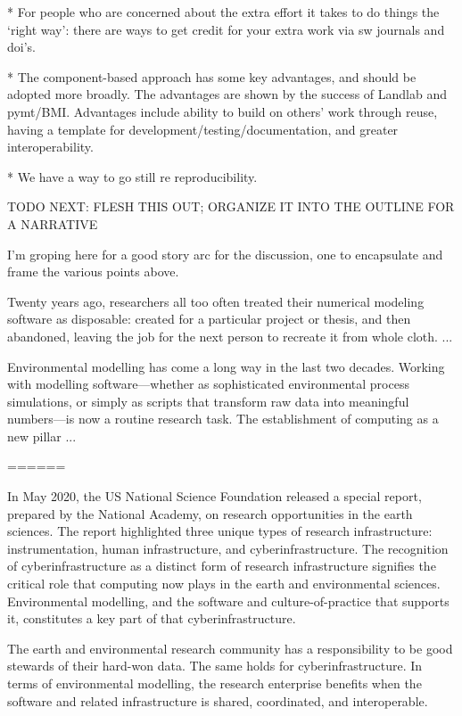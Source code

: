 \documentclass[12pt]{amsart}
\begin{document}
* For people who are concerned about the extra effort it takes to do things the `right way': there are ways to get credit for your extra work via sw journals and doi's.

* The component-based approach has some key advantages, and should be adopted more broadly. The advantages are shown by the success of Landlab and pymt/BMI. Advantages include ability to build on others' work through reuse, having a template for development/testing/documentation, and greater interoperability.

* We have a way to go still re reproducibility.

TODO NEXT: FLESH THIS OUT; ORGANIZE IT INTO THE OUTLINE FOR A NARRATIVE

I'm groping here for a good story arc for the discussion, one to encapsulate and frame the various points above.

Twenty years ago, researchers all too often treated their numerical modeling software as disposable: created for a particular project or thesis, and then abandoned, leaving the job for the next person to recreate it from whole cloth. ...

Environmental modelling has come a long way in the last two decades. Working with modelling software---whether as sophisticated environmental process simulations, or simply as scripts that transform raw data into meaningful numbers---is now a routine research task. The establishment of computing as a new pillar ...

======

In May 2020, the US National Science Foundation released a special report, prepared by the National Academy, on research opportunities in the earth sciences. The report highlighted three unique types of research infrastructure: instrumentation, human infrastructure, and cyberinfrastructure. The recognition of cyberinfrastructure as a distinct form of research infrastructure signifies the critical role that computing now plays in the earth and environmental sciences. Environmental modelling, and the software and culture-of-practice that supports it, constitutes a key part of that cyberinfrastructure.

The earth and environmental research community has a responsibility to be good stewards of their hard-won data. The same holds for cyberinfrastructure. In terms of environmental modelling, the research enterprise benefits when the software and related infrastructure is shared, coordinated, and interoperable. 
\end{document}

